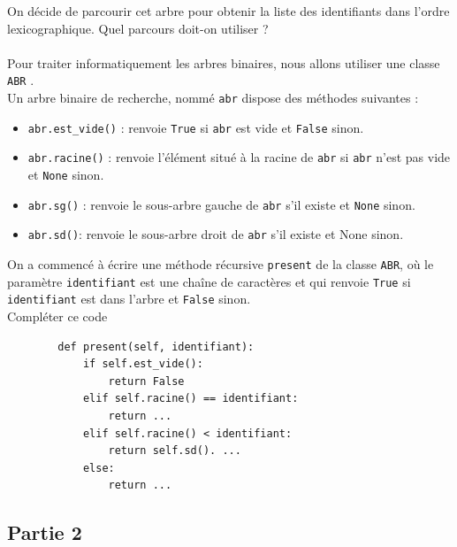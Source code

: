 \documentclass[a4paper,12pt,eval,firamath]{nsi}
\begin{document}
\question On décide de parcourir cet arbre pour obtenir la liste des identifiants dans l'ordre
lexicographique. Quel parcours doit-on utiliser ?\\

\\

Pour traiter informatiquement les arbres binaires, nous allons utiliser une classe
\texttt{ABR} .\\
Un arbre binaire de recherche, nommé \texttt{abr}  dispose des méthodes suivantes :
\newpage
\begin{itemize}
      \item \texttt{abr.est_vide()} : renvoie \texttt{True}  si \texttt{abr} est vide et \texttt{False} sinon.
      \item \texttt{abr.racine()} : renvoie l'élément situé à la racine de \texttt{abr}  si \texttt{abr} n'est pas vide et \texttt{None} sinon.
      \item \texttt{abr.sg()} : renvoie le sous-arbre gauche de \texttt{abr}  s'il existe et \texttt{None} sinon.
      \item \texttt{abr.sd()}: renvoie le sous-arbre droit de \texttt{abr} s'il existe et None sinon.
\end{itemize}

On a commencé à écrire une méthode récursive \texttt{present}  de la classe \texttt{ABR}, où le paramètre \texttt{identifiant}  est une chaîne de caractères et qui renvoie \texttt{True}  si \texttt{identifiant} est dans l'arbre et \texttt{False} sinon.\\

\question Compléter ce code
\begin{pyc}
      \begin{verbatim}
        def present(self, identifiant):
            if self.est_vide():
                return False
            elif self.racine() == identifiant:
                return ...
            elif self.racine() < identifiant:
                return self.sd(). ...
            else:
                return ...
    \end{verbatim}
\end{pyc}
\subsection*{Partie 2}
\end{document}
